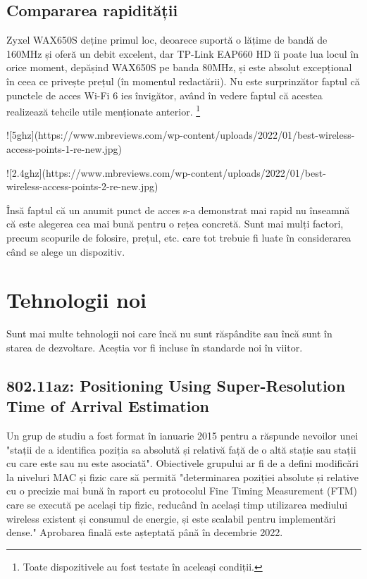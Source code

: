 \documentclass[a4paper,12pt]{report}
\def\oldchapter{} \let\oldchapter=\chapter{}
\def\chapter{\stepcounter{num_chapters}\oldchapter}
\begin{document}
\section{Compararea rapidității}

\cite{standards_ieee802_11_timeline}

Zyxel WAX650S deține primul loc, deoarece suportă o lățime de bandă de 160MHz și oferă un debit excelent, dar TP-Link EAP660 HD îi poate lua locul în orice moment, depășind WAX650S pe banda 80MHz, și este absolut excepțional în ceea ce privește prețul (în momentul redactării).
Nu este surprinzător faptul că punctele de acces Wi-Fi 6 ies învigător, având în vedere faptul că acestea realizează tehcile utile menționate anterior. \footnote{Toate dispozitivele au fost testate în aceleași condiții.}

![5ghz](https://www.mbreviews.com/wp-content/uploads/2022/01/best-wireless-access-points-1-re-new.jpg)

![2.4ghz](https://www.mbreviews.com/wp-content/uploads/2022/01/best-wireless-access-points-2-re-new.jpg)


Însă faptul că un anumit punct de acces s-a demonstrat mai rapid nu înseamnă că este alegerea cea mai bună pentru o rețea concretă. Sunt mai mulți factori, precum scopurile de folosire, prețul, etc. care tot trebuie fi luate în considerarea când se alege un dispozitiv.


\chapter{Tehnologii noi}

Sunt mai multe tehnologii noi care încă nu sunt răspândite sau încă sunt în starea de dezvoltare.
Aceștia vor fi incluse în standarde noi în viitor.

\section{802.11az: Positioning Using Super-Resolution Time of Arrival Estimation}

Un grup de studiu a fost format în ianuarie 2015 pentru a răspunde nevoilor unei "stații de a identifica poziția sa absolută și relativă față de o altă stație sau stații cu care este sau nu este asociată".
Obiectivele grupului ar fi de a defini modificări la niveluri MAC și fizic care să permită "determinarea poziției absolute și relative cu o precizie mai bună în raport cu protocolul Fine Timing Measurement (FTM) care se execută pe același tip fizic, reducând în același timp utilizarea mediului wireless existent și consumul de energie, și este scalabil pentru implementări dense."
Aprobarea finală este așteptată până în decembrie 2022.
\end{document}
